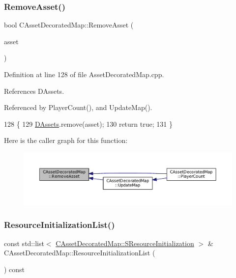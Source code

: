 \subsubsection{\texorpdfstring{Remove\+Asset()}{RemoveAsset()}}
{\footnotesize\ttfamily bool C\+Asset\+Decorated\+Map\+::\+Remove\+Asset (\begin{DoxyParamCaption}\item[{std\+::shared\+\_\+ptr$<$ \hyperlink{classCPlayerAsset}{C\+Player\+Asset} $>$}]{asset }\end{DoxyParamCaption})}



Definition at line 128 of file Asset\+Decorated\+Map.\+cpp.



References D\+Assets.



Referenced by Player\+Count(), and Update\+Map().


\begin{DoxyCode}
128                                                                        \{
129     \hyperlink{classCAssetDecoratedMap_a94eeed5b16141169b1ba6cb3842055aa}{DAssets}.remove(asset);
130     \textcolor{keywordflow}{return} \textcolor{keyword}{true};    
131 \}
\end{DoxyCode}
Here is the caller graph for this function\+:\nopagebreak
\begin{figure}[H]
\begin{center}
\leavevmode
\includegraphics[width=350pt]{classCAssetDecoratedMap_a77f46be1ceb30bb83fc3f35c0d58a9a7_icgraph}
\end{center}
\end{figure}
\hypertarget{classCAssetDecoratedMap_a279fb55e5536131b599275e8629d51cd}{}\label{classCAssetDecoratedMap_a279fb55e5536131b599275e8629d51cd} 
\subsubsection{\texorpdfstring{Resource\+Initialization\+List()}{ResourceInitializationList()}}
{\footnotesize\ttfamily const std\+::list$<$ \hyperlink{structCAssetDecoratedMap_1_1SResourceInitialization}{C\+Asset\+Decorated\+Map\+::\+S\+Resource\+Initialization} $>$ \& C\+Asset\+Decorated\+Map\+::\+Resource\+Initialization\+List (\begin{DoxyParamCaption}{ }\end{DoxyParamCaption}) const}



